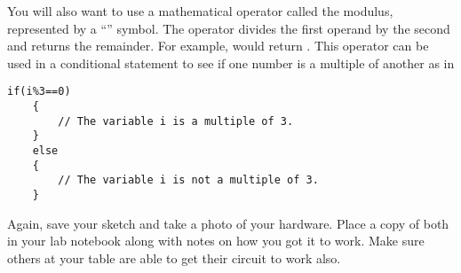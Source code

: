You will also want to use a mathematical operator called the modulus,
represented by a ``\code{\%}'' symbol. The operator divides the first operand
by the second and returns the remainder. For example,  would 
return . This operator can be used in a conditional statement to see
if one number is a multiple of another as in
\begin{lstlisting}[language=Arduino] 
    if(i%3==0)
    {
        // The variable i is a multiple of 3.
    }
    else
    {
        // The variable i is not a multiple of 3.
    }
\end{lstlisting}

Again, save your sketch and take a photo of 
your hardware. Place a copy of 
both in your lab notebook along with notes on how you got it to work. Make
sure others at your table are able to get their circuit to work also.




